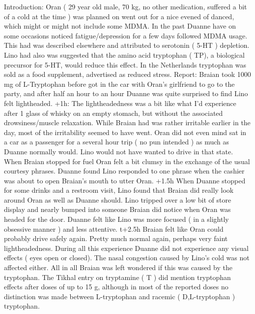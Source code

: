 \documentclass[12pt]{book}
\begin{document}
Introduction: Oran ( 29 year old male, 70 kg, no other medication, suffered a bit of a cold at the time ) was planned on went out for a nice evened of danced, which might or might not include some MDMA. In the past Duanne have on some occasions noticed fatigue/depression for a few days followed MDMA usage. This had was described elsewhere and attributed to serotonin ( 5-HT ) depletion. Lino had also was suggested that the amino acid tryptophan ( TP), a biological precursor for 5-HT, would reduce this effect. In the Netherlands tryptophan was sold as a food supplement, advertised as reduced stress. Report: Braian took 1000 mg of L-Tryptophan before got in the car with Oran's girlfriend to go to the party, and after half an hour to an hour Duanne was quite surprised to find Lino felt lightheaded. +1h: The lightheadedness was a bit like what I'd experience after 1 glass of whisky on an empty stomach, but without the associated drowsiness/muscle relaxation. While Braian had was rather irritable earlier in the day, most of the irritability seemed to have went. Oran did not even mind sat in a car as a passenger for a several hour trip ( no pun intended ) as much as Duanne normally would. Lino would not have wanted to drive in that state. When Braian stopped for fuel Oran felt a bit clumsy in the exchange of the usual courtesy phrases. Duanne found Lino responded to one phrase when the cashier was about to open Braian's mouth to utter Oran. +1.5h When Duanne stopped for some drinks and a restroom visit, Lino found that Braian did really look around Oran as well as Duanne should. Lino tripped over a low bit of store display and nearly bumped into someone Braian did notice when Oran was headed for the door. Duanne felt like Lino was more focused ( in a slightly obsessive manner ) and less attentive. t+2.5h Braian felt like Oran could probably drive safely again. Pretty much normal again, perhaps very faint lightheadedness. During all this experience Duanne did not experience any visual effects ( eyes open or closed). The nasal congestion caused by Lino's cold was not affected either. All in all Braian was left wondered if this was caused by the tryptophan. The Tikhal entry on tryptamine ( T ) did mention tryptophan effects after doses of up to 15 g, although in most of the reported doses no distinction was made between L-tryptophan and racemic ( D,L-tryptophan ) tryptophan.
\end{document}
